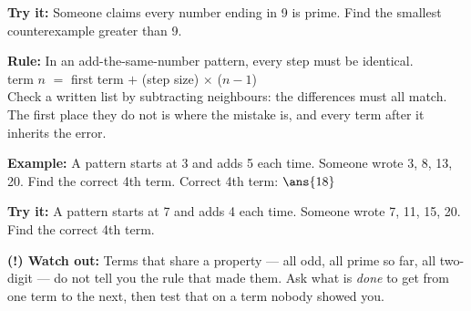 \documentclass[12pt]{article}
\begin{document}
\begin{tryitbox}
\textbf{Try it:} \quad Someone claims every number ending in 9 is prime. Find the smallest counterexample greater than 9.\\[2pt]
\end{tryitbox}


\begin{formulabox}
\textbf{Rule:} In an add-the-same-number pattern, every step must be identical.\\[3pt]
term $n$ $=$ first term $+$ (step size) $\times$ ($n - 1$)\\[3pt]
Check a written list by subtracting neighbours: the differences must all match. The first place they do not is where the mistake is, and every term after it inherits the error.
\end{formulabox}

\begin{examplebox}
\textbf{Example:} \quad A pattern starts at 3 and adds 5 each time. Someone wrote 3, 8, 13, 20. Find the correct 4th term.
Correct 4th term: $\ans{18}$
\end{examplebox}

\begin{tryitbox}
\textbf{Try it:} \quad A pattern starts at 7 and adds 4 each time. Someone wrote 7, 11, 15, 20. Find the correct 4th term.\\[2pt]
\end{tryitbox}

\begin{watchoutbox}
\textbf{(!) Watch out:} Terms that share a property --- all odd, all prime so far, all two-digit --- do not tell you the rule that made them. Ask what is \emph{done} to get from one term to the next, then test that on a term nobody showed you.
\end{watchoutbox}
\end{document}

